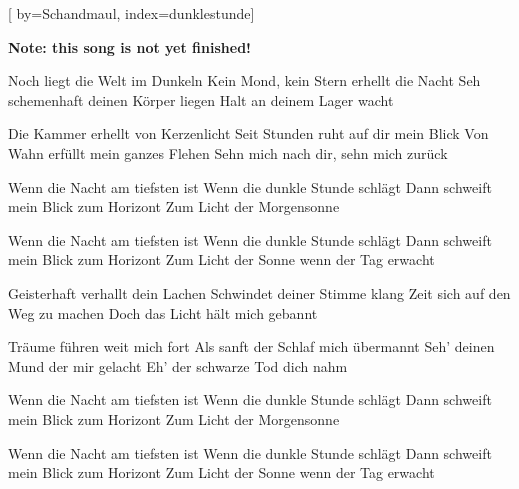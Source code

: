 

[%
    by={Schandmaul},
    index={dunklestunde}]


    \label{dunklestunde}

    \textbf{Note: this song is not yet finished!}

    \beginverse
        Noch liegt die Welt im Dunkeln
        Kein Mond, kein Stern erhellt die Nacht
        Seh schemenhaft deinen Körper liegen
        Halt an deinem Lager wacht

        Die Kammer erhellt von Kerzenlicht
        Seit Stunden ruht auf dir mein Blick
        Von Wahn erfüllt mein ganzes Flehen
        Sehn mich nach dir, sehn mich zurück
    \endverse

    \beginchorus
        Wenn die Nacht am tiefsten ist
        Wenn die dunkle Stunde schlägt
        Dann schweift mein Blick zum Horizont
        Zum Licht der Morgensonne

        Wenn die Nacht am tiefsten ist
        Wenn die dunkle Stunde schlägt
        Dann schweift mein Blick zum Horizont
        Zum Licht der Sonne wenn der Tag erwacht
    \endchorus

    \beginverse
        Geisterhaft verhallt dein Lachen
        Schwindet deiner Stimme klang
        Zeit sich auf den Weg zu machen
        Doch das Licht hält mich gebannt

        Träume führen weit mich fort
        Als sanft der Schlaf mich übermannt
        Seh' deinen Mund der mir gelacht
        Eh' der schwarze Tod dich nahm
    \endverse

    \beginchorus
        Wenn die Nacht am tiefsten ist
        Wenn die dunkle Stunde schlägt
        Dann schweift mein Blick zum Horizont
        Zum Licht der Morgensonne

        Wenn die Nacht am tiefsten ist
        Wenn die dunkle Stunde schlägt
        Dann schweift mein Blick zum Horizont
        Zum Licht der Sonne wenn der Tag erwacht
    \endchorus
\endsong
